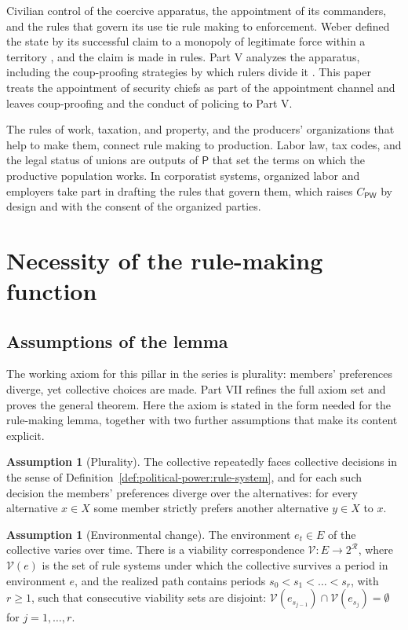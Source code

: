 \documentclass[11pt,letterpaper]{article}
\theoremstyle{definition}
\newtheorem{assumption}[theorem]{Assumption}
\theoremstyle{remark}
\newcommand{\pP}{\mathsf{P}}
\newcommand{\pW}{\mathsf{W}}
\newcommand{\Rules}{\mathcal{R}}
\begin{document}
Civilian control of the coercive apparatus, the appointment of its commanders, and the rules that govern its use tie rule making to enforcement. Weber defined the state by its successful claim to a monopoly of legitimate force within a territory \citep{weber1946}, and the claim is made in rules. Part V analyzes the apparatus, including the coup-proofing strategies by which rulers divide it \citep[Proposition~6.4]{long2026coercive}. This paper treats the appointment of security chiefs as part of the appointment channel and leaves coup-proofing and the conduct of policing to Part V.

The rules of work, taxation, and property, and the producers' organizations that help to make them, connect rule making to production. Labor law, tax codes, and the legal status of unions are outputs of $\pP$ that set the terms on which the productive population works. In corporatist systems, organized labor and employers take part in drafting the rules that govern them, which raises $C_{\pP\pW}$ by design and with the consent of the organized parties.

\section{Necessity of the rule-making function}
\label{sec:necessity}

\subsection{Assumptions of the lemma}

The working axiom for this pillar in the series is plurality: members' preferences diverge, yet collective choices are made. Part VII refines the full axiom set and proves the general theorem. Here the axiom is stated in the form needed for the rule-making lemma, together with two further assumptions that make its content explicit.

\begin{assumption}[Plurality]
\label{ass:political-power:plurality}
The collective repeatedly faces collective decisions in the sense of Definition~\ref{def:political-power:rule-system}, and for each such decision the members' preferences diverge over the alternatives: for every alternative $x\in X$ some member strictly prefers another alternative $y\in X$ to $x$.
\end{assumption}

\begin{assumption}[Environmental change]
\label{ass:political-power:change}
The environment $e_t\in E$ of the collective varies over time. There is a viability correspondence $\mathcal{V}:E\to 2^{\Rules}$, where $\mathcal{V}(e)$ is the set of rule systems under which the collective survives a period in environment $e$, and the realized path contains periods $s_0<s_1<\dots<s_r$, with $r\ge1$, such that consecutive viability sets are disjoint: $\mathcal{V}(e_{s_{j-1}})\cap\mathcal{V}(e_{s_j})=\emptyset$ for $j=1,\dots,r$.
\end{assumption}
\end{document}
